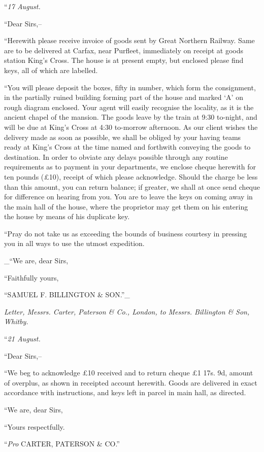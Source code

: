 \documentclass[12pt,openright]{book}
\begin{document}
“\textit{17 August.}

“Dear Sirs,–

“Herewith please receive invoice of goods sent by Great Northern Railway. Same are to be delivered at Carfax, near Purfleet, immediately on receipt at goods station King’s Cross. The house is at present empty, but enclosed please find keys, all of which are labelled.

“You will please deposit the boxes, fifty in number, which form the consignment, in the partially ruined building forming part of the house and marked ‘A’ on rough diagram enclosed. Your agent will easily recognise the locality, as it is the ancient chapel of the mansion. The goods leave by the train at 9:30 to-night, and will be due at King’s Cross at 4:30 to-morrow afternoon. As our client wishes the delivery made as soon as possible, we shall be obliged by your having teams ready at King’s Cross at the time named and forthwith conveying the goods to destination. In order to obviate any delays possible through any routine requirements as to payment in your departments, we enclose cheque herewith for ten pounds (£10), receipt of which please acknowledge. Should the charge be less than this amount, you can return balance; if greater, we shall at once send cheque for difference on hearing from you. You are to leave the keys on coming away in the main hall of the house, where the proprietor may get them on his entering the house by means of his duplicate key.

“Pray do not take us as exceeding the bounds of business courtesy in pressing you in all ways to use the utmost expedition.

\_“We are, dear Sirs,

“Faithfully yours,

“SAMUEL F. BILLINGTON \& SON.”\_

\textit{Letter, Messrs. Carter, Paterson \& Co., London, to Messrs. Billington \&}\textit{ }\textit{Son, Whitby.}

“\textit{21 August.}

“Dear Sirs,–

“We beg to acknowledge £10 received and to return cheque £1 17s. 9d, amount of overplus, as shown in receipted account herewith. Goods are delivered in exact accordance with instructions, and keys left in parcel in main hall, as directed.

“We are, dear Sirs,

“Yours respectfully.

“\textit{Pro} CARTER, PATERSON \& CO.”
\end{document}
